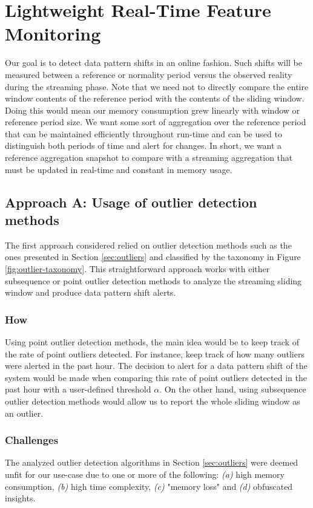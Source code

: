 \chapter{Lightweight Real-Time Feature Monitoring} \label{chap:my-work} \minitoc

Our goal is to detect data pattern shifts in an online fashion. Such shifts will be measured between a reference or normality period versus the observed reality during the streaming phase. Note that we need not to directly compare the entire window contents of the reference period with the contents of the sliding window. Doing this would mean our memory consumption grew linearly with window or reference period size. We want some sort of aggregation over the reference period that can be maintained efficiently throughout run-time and can be used to distinguish both periods of time and alert for changes. In short, we want a reference aggregation snapshot to compare with a streaming aggregation that must be updated in real-time and constant in memory usage.

\section{Approach A: Usage of outlier detection methods}
The first approach considered relied on outlier detection methods such as the ones presented in Section \ref{sec:outliers} and classified by the taxonomy in Figure \ref{fig:outlier-taxonomy}. This straightforward approach works with either subsequence or point outlier detection methods to analyze the streaming sliding window and produce data pattern shift alerts.

\subsection*{How}

Using point outlier detection methods, the main idea would be to keep track of the rate of point outliers detected. For instance, keep track of how many outliers were alerted in the past hour. The decision to alert for a data pattern shift of the system would be made when comparing this rate of point outliers detected in the past hour with a user-defined threshold $\alpha$. On the other hand, using subsequence outlier detection methods would allow us to report the whole sliding window as an outlier. 


\subsection*{Challenges}
The analyzed outlier detection algorithms in Section \ref{sec:outliers} were deemed unfit for our use-case due to one or more of the following: \textit{(a)} high memory consumption, \textit{(b)} high time complexity, \textit{(c)} "memory loss" and \textit{(d)} obfuscated insights.

